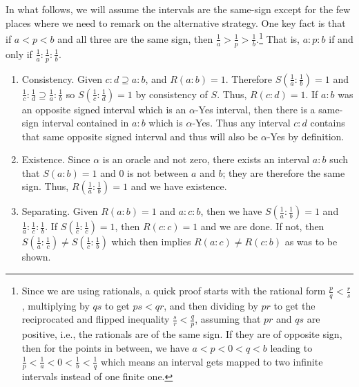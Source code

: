 \documentclass[12pt]{article}
\theoremstyle{remark}
\begin{document}
\begin{itemize}
    In what follows, we will assume the intervals are the same-sign except for the few places where we need to remark on the alternative strategy. One key fact is that if $a<p<b$ and all three are the same sign, then $\frac{1}{a} > \frac{1}{p} > \frac{1}{b}$.\footnote{Since we are using rationals, a quick proof starts with the rational form $\frac{p}{q} < \frac{r}{s}$, multiplying by $qs$ to get $ps < qr$, and then dividing by $pr$ to get the reciprocated and flipped inequality $\frac{s}{r} < \frac{q}{p}$, assuming that $pr$ and $qs$ are positive, i.e., the rationals are of the same sign. If they are of opposite sign, then for the points in between, we have $a < p < 0< q< b$ leading to $\frac{1}{p} < \frac{1}{a} < 0 < \frac{1}{b} < \frac{1}{q}$ which means an interval gets mapped to two infinite intervals instead of one finite one.} That is, $a:p:b$ if and only if $\frac{1}{a}:\frac{1}{p}:\frac{1}{b}$.
    
    \begin{enumerate}
        \item Consistency. Given $c:d \supseteq a:b$, and $R(a:b)=1$. Therefore $S(\frac{1}{a}:\frac{1}{b}) = 1$ and $\frac{1}{c}:\frac{1}{d} \supseteq \frac{1}{a}:\frac{1}{b}$ so $S(\frac{1}{c}:\frac{1}{d})=1$ by consistency of $S$. Thus, $R(c:d) = 1$. If $a:b$ was an opposite signed interval which is an $\alpha$-Yes interval, then there is a same-sign interval contained in $a:b$ which is $\alpha$-Yes. Thus any interval $c:d$ contains that same opposite signed interval and thus will also be $\alpha$-Yes by definition. 
        \item Existence. Since $\alpha$ is an oracle and not zero, there exists an interval $a:b$ such that $S(a:b)=1$ and 0 is not between $a$ and $b$; they are therefore the same sign. Thus, $R(\frac{1}{a}:\frac{1}{b})=1$ and we have existence. 
        \item Separating. Given $R(a:b)=1$ and $a:c:b$, then we have $S(\frac{1}{a}:\frac{1}{b})=1$ and $\frac{1}{a}:\frac{1}{c}:\frac{1}{b}$. If $S(\frac{1}{c}:\frac{1}{c})=1$, then $R(c:c)=1$ and we are done. If not, then $S(\frac{1}{a}:\frac{1}{c}) \neq S(\frac{1}{c}:\frac{1}{b})$ which then implies $R(a:c)\neq R(c:b)$ as was to be shown. 
        

\end{enumerate}
\end{itemize}
\end{document}
